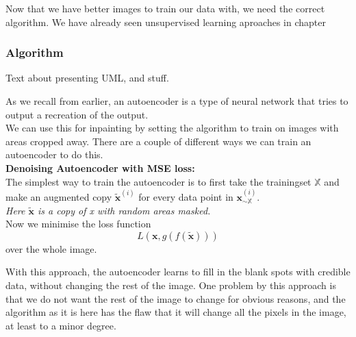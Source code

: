     Now that we have better images to train our data with, we need the correct algorithm.
    We have already seen unsupervised learning aproaches in chapter %
    \newpage
    \subsubsection{Algorithm}
      Text about presenting UML, and stuff.
  
    \newpage
    As we recall from earlier, an autoencoder is a type of neural network that tries to output a recreation of the output.\\%
    We can use this for inpainting by setting the algorithm to train on images with areas cropped away.
    There are a couple of different ways we can train an autoencoder to do this.\\
    
    
    
    \vspace{10px}
    \textbf{Denoising Autoencoder with MSE loss:}\label{par:Denoising_Autoencoder_with_MSE_loss}\\
    The simplest way to train the autoencoder is to first take the trainingset $\mathds{X}$ and make an augmented copy $\widetilde{\textbf{x}}^{(i)}$ for 
    every data point in $\textbf{x}_{\sim \mathds{X}}^{(i)}$. \\
    \textit{Here $\widetilde{\textbf{x}}$ is a copy of x with random areas masked.}\\
    
    Now we minimise the loss function\\    
      \begin{equation}
        L(\textbf{x},g(f(\widetilde{\textbf{x}})))
      \end{equation}
    over the whole image.\\
    \vspace{20px}
    
    With this approach, the autoencoder learns to fill in the blank spots with credible data, without changing the rest of the image. 
    One problem by this approach is that we do not want the rest of the image to change for obvious reasons, and the algorithm as it is here has the flaw that it will change all the pixels in the image, at least to a minor degree. \\
    
